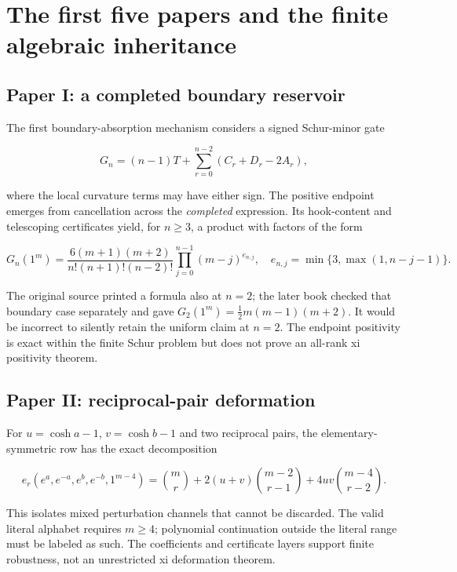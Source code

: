 \documentclass[
  10pt,
  a4paper,
  10pt,
  oneside,
  openany]{book}
\begin{document}
\section{The first five papers and the finite algebraic
inheritance}\label{the-first-five-papers-and-the-finite-algebraic-inheritance}

\subsection{Paper I: a completed boundary
reservoir}\label{paper-i-a-completed-boundary-reservoir}

The first boundary-absorption mechanism considers a signed Schur-minor
gate

\[
G_n=(n-1)T+\sum_{r=0}^{n-2}(C_r+D_r-2A_r),
\tag{S3.1}\label{eq:S3.1}
\]

where the local curvature terms may have either sign. The positive
endpoint emerges from cancellation across the \emph{completed}
expression. Its hook-content and telescoping certificates yield, for
\(n\ge3\), a product with factors of the form

\[
G_n(1^m)=\frac{6(m+1)(m+2)}{n!(n+1)!(n-2)!}
\prod_{j=0}^{n-1}(m-j)^{e_{n,j}},
\quad e_{n,j}=\min\{3,\max(1,n-j-1)\}.
\tag{S3.2}\label{eq:S3.2}
\]

The original source printed a formula also at \(n=2\); the later book
checked that boundary case separately and gave
\(G_2(1^m)=\frac12m(m-1)(m+2)\). It would be incorrect to silently
retain the uniform claim at \(n=2\). The endpoint positivity is exact
within the finite Schur problem but does not prove an all-rank xi
positivity theorem.

\subsection{Paper II: reciprocal-pair
deformation}\label{paper-ii-reciprocal-pair-deformation}

For \(u=\cosh a-1\), \(v=\cosh b-1\) and two reciprocal pairs, the
elementary-symmetric row has the exact decomposition

\[
e_r(e^a,e^{-a},e^b,e^{-b},1^{m-4})
=\binom mr+2(u+v)\binom{m-2}{r-1}+4uv\binom{m-4}{r-2}.
\tag{S3.3}\label{eq:S3.3}
\]

This isolates mixed perturbation channels that cannot be discarded. The
valid literal alphabet requires \(m\ge4\); polynomial continuation
outside the literal range must be labeled as such. The coefficients and
certificate layers support finite robustness, not an unrestricted xi
deformation theorem.
\end{document}

